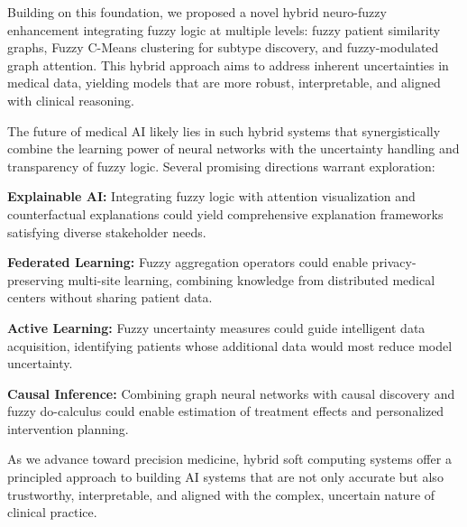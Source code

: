 \documentclass[conference]{IEEEtran}
\begin{document}
Building on this foundation, we proposed a novel hybrid neuro-fuzzy enhancement integrating fuzzy logic at multiple levels: fuzzy patient similarity graphs, Fuzzy C-Means clustering for subtype discovery, and fuzzy-modulated graph attention. This hybrid approach aims to address inherent uncertainties in medical data, yielding models that are more robust, interpretable, and aligned with clinical reasoning.

The future of medical AI likely lies in such hybrid systems that synergistically combine the learning power of neural networks with the uncertainty handling and transparency of fuzzy logic. Several promising directions warrant exploration:

\textbf{Explainable AI:} Integrating fuzzy logic with attention visualization and counterfactual explanations could yield comprehensive explanation frameworks satisfying diverse stakeholder needs.

\textbf{Federated Learning:} Fuzzy aggregation operators could enable privacy-preserving multi-site learning, combining knowledge from distributed medical centers without sharing patient data.

\textbf{Active Learning:} Fuzzy uncertainty measures could guide intelligent data acquisition, identifying patients whose additional data would most reduce model uncertainty.

\textbf{Causal Inference:} Combining graph neural networks with causal discovery and fuzzy do-calculus could enable estimation of treatment effects and personalized intervention planning.

As we advance toward precision medicine, hybrid soft computing systems offer a principled approach to building AI systems that are not only accurate but also trustworthy, interpretable, and aligned with the complex, uncertain nature of clinical practice.
\end{document}
